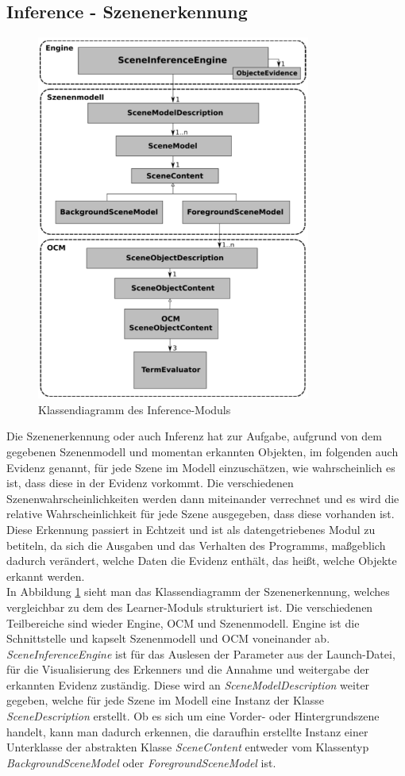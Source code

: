 \subsection{Inference - Szenenerkennung}\label{sub:inference}
\begin{figure}
	\centering
	\includegraphics[width=9cm]{bilder/InferenceClass.pdf}
	\caption{Klassendiagramm des Inference-Moduls \cite{gehrung14}}
	\label{img:inferenceclass}
\end{figure}
Die Szenenerkennung oder auch Inferenz hat zur Aufgabe, aufgrund von dem gegebenen Szenenmodell und momentan erkannten Objekten, im folgenden auch Evidenz genannt, für jede Szene im Modell einzuschätzen, wie wahrscheinlich es ist, dass diese in der Evidenz vorkommt. Die verschiedenen Szenenwahrscheinlichkeiten werden dann miteinander verrechnet und es wird die relative Wahrscheinlichkeit für jede Szene ausgegeben, dass diese vorhanden ist. Diese Erkennung passiert in Echtzeit und ist als datengetriebenes Modul zu betiteln, da sich die Ausgaben und das Verhalten des Programms, maßgeblich dadurch verändert, welche Daten die Evidenz enthält, das heißt, welche Objekte erkannt werden.\cite{mehlhaus16}\smallskip\\
In Abbildung \ref{img:inferenceclass} sieht man das Klassendiagramm der Szenenerkennung, welches vergleichbar zu dem des Learner-Moduls strukturiert ist. Die verschiedenen Teilbereiche sind wieder Engine, OCM und Szenenmodell. Engine ist die Schnittstelle und kapselt Szenenmodell und OCM voneinander ab. \textit{SceneInferenceEngine} ist für das Auslesen der Parameter aus der Launch-Datei, für die Visualisierung des Erkenners und die Annahme und weitergabe der erkannten Evidenz zuständig. Diese wird an \textit{SceneModelDescription} weiter gegeben, welche für jede Szene im Modell eine Instanz der Klasse \textit{SceneDescription} erstellt. Ob es sich um eine Vorder- oder Hintergrundszene handelt, kann man dadurch erkennen, die daraufhin erstellte Instanz einer Unterklasse der abstrakten Klasse \textit{SceneContent} entweder vom Klassentyp \textit{BackgroundSceneModel} oder \textit{ForegroundSceneModel} ist. \smallskip\\
